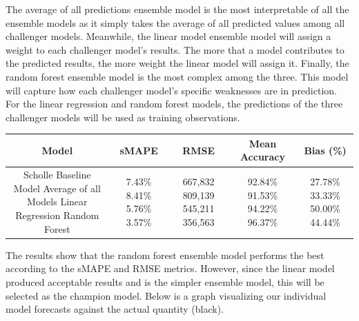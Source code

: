 \documentclass[12pt,oneside]{chicagocapstone}
\begin{document}
The average of all predictions ensemble model is the most interpretable
of all the ensemble models as it simply takes the average of all
predicted values among all challenger models. Meanwhile, the linear
model ensemble model will assign a weight to each challenger model's
results. The more that a model contributes to the predicted results, the
more weight the linear model will assign it. Finally, the random forest
ensemble model is the most complex among the three. This model will
capture how each challenger model's specific weaknesses are in
prediction. For the linear regression and random forest models, the
predictions of the three challenger models will be used as training
observations.
\begin{longtable}[]{@{}ccccc@{}}
\toprule
\begin{minipage}[b]{0.27\columnwidth}\centering\strut
Model\strut
\end{minipage} & \begin{minipage}[b]{0.13\columnwidth}\centering\strut
sMAPE\strut
\end{minipage} & \begin{minipage}[b]{0.14\columnwidth}\centering\strut
RMSE\strut
\end{minipage} & \begin{minipage}[b]{0.16\columnwidth}\centering\strut
Mean Accuracy\strut
\end{minipage} & \begin{minipage}[b]{0.16\columnwidth}\centering\strut
Bias (\%)\strut
\end{minipage}\tabularnewline
\midrule
\endhead
\begin{minipage}[t]{0.27\columnwidth}\centering\strut
Scholle Baseline Model Average of all Models Linear Regression Random
Forest\strut
\end{minipage} & \begin{minipage}[t]{0.13\columnwidth}\centering\strut
7.43\% 8.41\% 5.76\% 3.57\%\strut
\end{minipage} & \begin{minipage}[t]{0.14\columnwidth}\centering\strut
667,832 809,139 545,211 356,563\strut
\end{minipage} & \begin{minipage}[t]{0.16\columnwidth}\centering\strut
92.84\% 91.53\% 94.22\% 96.37\%\strut
\end{minipage} & \begin{minipage}[t]{0.16\columnwidth}\centering\strut
27.78\% 33.33\% 50.00\% 44.44\%\strut
\end{minipage}\tabularnewline
\bottomrule
\end{longtable}
The results show that the random forest ensemble model performs the best
according to the sMAPE and RMSE metrics. However, since the linear model
produced acceptable results and is the simpler ensemble model, this will
be selected as the champion model. Below is a graph visualizing our
individual model forecasts against the actual quantity (black).
\end{document}
